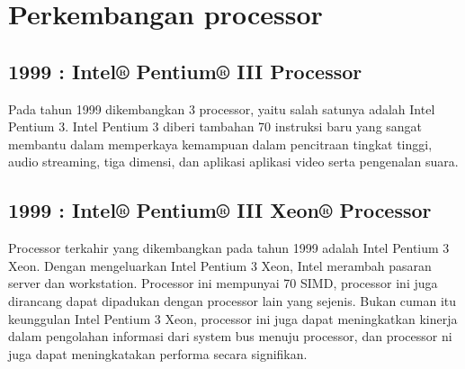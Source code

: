 \section{Perkembangan processor}
	\subsection{1999 : Intel® Pentium® III Processor}
	Pada tahun 1999 dikembangkan 3 processor, yaitu salah satunya adalah Intel Pentium 3. Intel Pentium 3 diberi tambahan 70 instruksi baru yang sangat membantu dalam memperkaya kemampuan dalam pencitraan tingkat tinggi, audio streaming, tiga dimensi, dan aplikasi aplikasi video serta pengenalan suara. 
	\subsection{1999 : Intel® Pentium® III Xeon® Processor}
	Processor terkahir yang dikembangkan pada tahun 1999 adalah Intel Pentium 3 Xeon. Dengan mengeluarkan Intel Pentium 3 Xeon, Intel merambah pasaran server dan workstation. Processor ini mempunyai 70 SIMD, processor ini juga dirancang dapat dipadukan dengan processor lain yang sejenis. Bukan cuman itu keunggulan Intel Pentium 3 Xeon, processor ini juga dapat meningkatkan kinerja dalam pengolahan informasi dari system bus menuju processor, dan processor ni juga dapat meningkatakan performa secara signifikan.